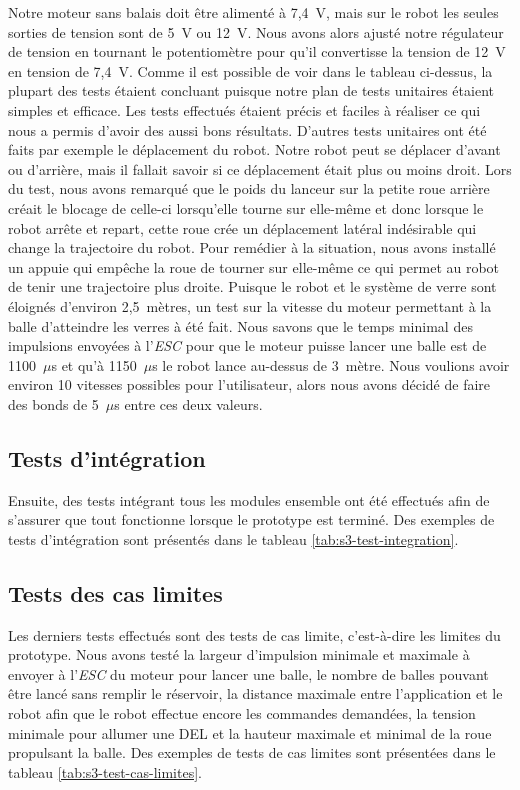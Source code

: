Notre moteur sans balais doit être alimenté à 7,4~V, mais sur le robot les seules sorties de tension sont de 5~V ou 12~V.
Nous avons alors ajusté notre régulateur de tension en tournant le potentiomètre pour qu’il convertisse la tension de 12~V en tension de 7,4~V.
Comme il est possible de voir dans le tableau ci-dessus, la plupart des tests étaient concluant puisque notre plan de tests unitaires étaient simples et efficace.
Les tests effectués étaient précis et faciles à réaliser ce qui nous a permis d’avoir des aussi bons résultats.
D'autres tests unitaires ont été faits par exemple le déplacement du robot.
Notre robot peut se déplacer d’avant ou d’arrière, mais il fallait savoir si ce déplacement était plus ou moins droit.
Lors du test, nous avons remarqué que le poids du lanceur sur la petite roue arrière créait le blocage de celle-ci lorsqu’elle tourne sur elle-même et donc lorsque le robot arrête et repart, cette roue crée un déplacement latéral indésirable qui change la trajectoire du robot.
Pour remédier à la situation, nous avons installé un appuie qui empêche la roue de tourner sur elle-même ce qui permet au robot de tenir une trajectoire plus droite.
Puisque le robot et le système de verre sont éloignés d’environ 2,5~mètres, un test sur la vitesse du moteur permettant à la balle d’atteindre les verres à été fait.
Nous savons que le temps minimal des impulsions envoyées à l'\emph{ESC} pour que le moteur puisse lancer une balle est de 1100~$\mu$s et qu’à 1150~$\mu$s le robot lance au-dessus de 3~mètre.
Nous voulions avoir environ 10 vitesses possibles pour l’utilisateur, alors nous avons décidé de faire des bonds de 5~$\mu$s entre ces deux valeurs.

\subsection{Tests d'intégration}

Ensuite, des tests intégrant tous les modules ensemble ont été effectués afin de s’assurer que tout fonctionne lorsque le prototype est terminé.
Des exemples de tests d'intégration sont présentés dans le tableau \ref{tab:s3-test-integration}.

\subsection{Tests des cas limites}

Les derniers tests effectués sont des tests de cas limite, c’est-à-dire les limites du prototype.
Nous avons testé la largeur d’impulsion minimale et maximale à envoyer à l'\emph{ESC} du moteur pour lancer une balle, le nombre de balles pouvant être lancé sans remplir le réservoir, la distance maximale entre l’application et le robot afin que le robot effectue encore les commandes demandées, la tension minimale pour allumer une DEL et la hauteur maximale et minimal de la roue propulsant la balle.
Des exemples de tests de cas limites sont présentées dans le tableau \ref{tab:s3-test-cas-limites}.

